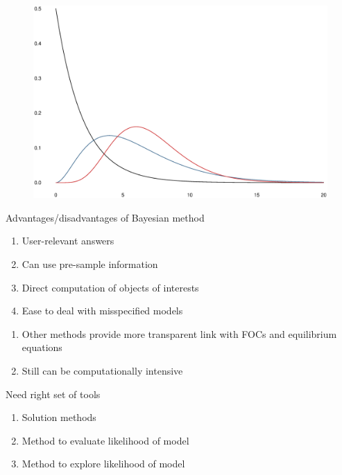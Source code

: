 \documentclass{beamer}
\begin{document}
\begin{frame}
\begin{figure}
    \includegraphics[scale=.3]{prior_gamma.eps}
  \end{figure}
\end{frame}

\begin{frame}
  Advantages/disadvantages of Bayesian method
  \begin{enumerate}
    \item User-relevant answers
    \item Can use pre-sample information
    \item Direct computation of objects of interests
    \item Ease to deal with misspecified models
  \end{enumerate}
  \begin{enumerate}
    \item Other methods provide more transparent link with FOCs and equilibrium equations
    \item Still can be computationally intensive
  \end{enumerate}
\end{frame}

\begin{frame}
 Need right set of tools
 \begin{enumerate}
   \item Solution methods
   \item Method to evaluate likelihood of model
   \item Method to explore likelihood of model
 \end{enumerate}
\end{frame}
\end{document}
